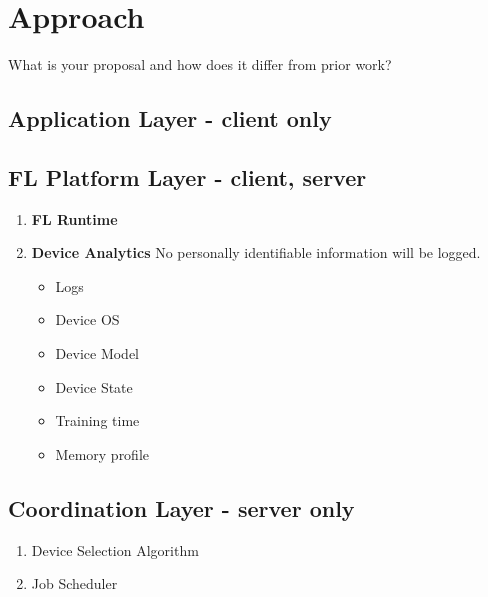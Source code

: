 \section{Approach}
    What is your proposal and how does it differ from prior work?

    \subsection{Application Layer - client only}
    \subsection{FL Platform Layer - client, server}
        \begin{enumerate}
            \item \textbf{FL Runtime} \newline
            \item \textbf{Device Analytics} \newline
                No personally identifiable information will be logged. \newline
                \begin{itemize}
                    \item Logs
                    \item Device OS
                    \item Device Model
                    \item Device State
                    \item Training time
                    \item Memory profile
                \end{itemize}
        \end{enumerate}
    \subsection{Coordination Layer - server only}
        \begin{enumerate}
            \item Device Selection Algorithm \newline
            \item Job Scheduler
        \end{enumerate}